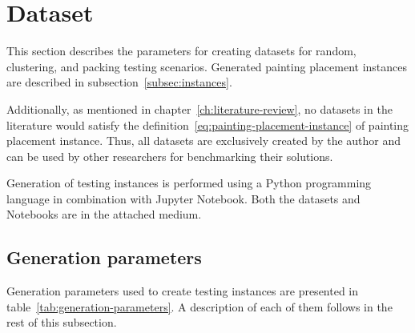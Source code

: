 \section{Dataset}\label{sec:dataset}

This section describes the parameters for creating datasets for random, clustering, and packing testing scenarios.
Generated painting placement instances are described in subsection~\ref{subsec:instances}.

Additionally, as mentioned in chapter~\ref{ch:literature-review}, no datasets in the
literature would satisfy the definition~\ref{eq:painting-placement-instance} of painting placement instance.
Thus, all datasets are exclusively created by the author and can be used by other researchers
for benchmarking their solutions.

Generation of testing instances is performed using a Python programming language in combination with Jupyter Notebook.
Both the datasets and Notebooks are in the attached medium.

\subsection{Generation parameters}\label{subsec:generation-parameters}

Generation parameters used to create testing instances are presented in table~\ref{tab:generation-parameters}.
A description of each of them follows in the rest of this subsection.


